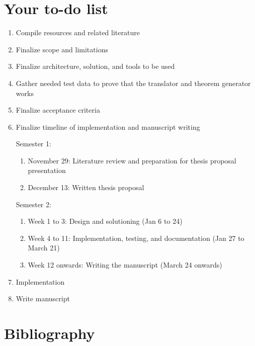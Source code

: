 \documentclass[11pt,A4]{article}
\newcommand{\blue}[1]{\textcolor{RoyalBlue}{#1}}
\newcommand{\instructions}[1]{\blue{\textit{#1}}}
\renewcommand{\instructions}[1]{}
\begin{document}
\section*{Your to-do list}
\instructions{Get started by making a to-do list. Set yourself deadlines. Here are a few
  items that might appear on your to-do list}
\begin{enumerate}
    \item Compile resources and related literature
    \item Finalize scope and limitations
    \item Finalize architecture, solution, and tools to be used
    \item Gather needed test data to prove that the translator and theorem generator works 
    \item Finalize acceptance criteria
    \item Finalize timeline of implementation and manuscript writing\par
        Semester 1: 
        \begin{enumerate}
            \item November 29: Literature review and preparation for thesis proposal presentation
            \item December 13: Written thesis proposal
        \end{enumerate}
        Semester 2:
        \begin{enumerate}
            \item Week 1 to 3: Design and solutioning (Jan 6 to 24)
            \item Week 4 to 11: Implementation, testing, and documentation (Jan 27 to March 21)
            \item Week 12 onwards: Writing the manuscript (March 24 onwards)
        \end{enumerate}
    \item Implementation
    \item Write manuscript 
\end{enumerate}

\section*{Bibliography}
\instructions{Your references for the background section, should go in your own .bib file. You then need to run {\tt bibtex}.\footnote{You may want to look at \url{http://www.bibtex.org/Using/}}.  If you call your bibliography {\tt mybib.bib} and put it in the same directory as this {\tt .tex} file, add {\tt$\backslash$bibliography\{mybib\}} before {\tt$\backslash$end\{document\}}
}


\end{document}
